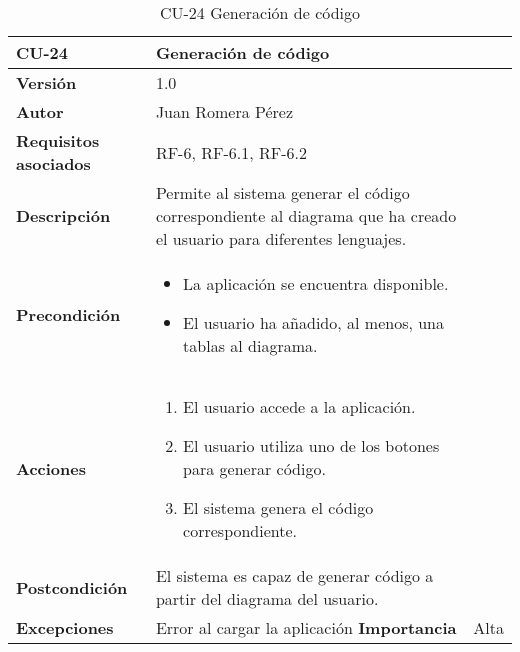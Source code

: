 \begin{table}[p]
    \centering
    \begin{tabularx}{\linewidth}{ p{} p{}}
		\toprule
		\textbf{CU-24}    & \textbf{Generación de código}\\
		\toprule
		\textbf{Versión}              & 1.0    \\
		\textbf{Autor}                & Juan Romera Pérez \\
		\textbf{Requisitos asociados} & RF-6, RF-6.1, RF-6.2 \\
		\textbf{Descripción}          & Permite al sistema generar el código correspondiente al diagrama que ha creado el usuario para diferentes lenguajes. \\
		\textbf{Precondición}         & \begin{itemize}
		    \item La aplicación se encuentra disponible.
            \item El usuario ha añadido, al menos, una tablas al diagrama.
		\end{itemize} \\
		\textbf{Acciones}             &
		\begin{enumerate}
			\def\labelenumi{\arabic{enumi}.}
			\tightlist
			\item El usuario accede a la aplicación.
            \item El usuario utiliza uno de los botones para generar código.
            \item El sistema genera el código correspondiente.
		\end{enumerate}\\
		\textbf{Postcondición}        & El sistema es capaz de generar código a partir del diagrama del usuario. \\
		\textbf{Excepciones}          & Error al cargar la aplicación
		\textbf{Importancia}          & Alta \\
		\bottomrule
    \end{tabularx}
    \caption{CU-24 Generación de código}
\end{table}

